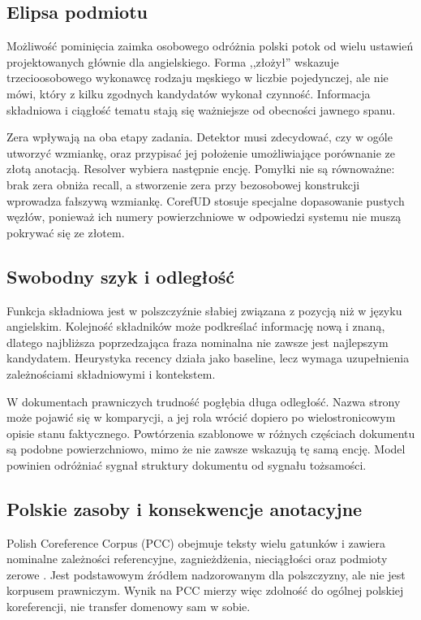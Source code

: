 \subsection{Elipsa podmiotu}

Możliwość pominięcia zaimka osobowego odróżnia polski potok od wielu ustawień projektowanych głównie dla angielskiego. Forma ,,złożył'' wskazuje trzecioosobowego wykonawcę rodzaju męskiego w liczbie pojedynczej, ale nie mówi, który z kilku zgodnych kandydatów wykonał czynność. Informacja składniowa i ciągłość tematu stają się ważniejsze od obecności jawnego spanu.

Zera wpływają na oba etapy zadania. Detektor musi zdecydować, czy w ogóle utworzyć wzmiankę, oraz przypisać jej położenie umożliwiające porównanie ze złotą anotacją. Resolver wybiera następnie encję. Pomyłki nie są równoważne: brak zera obniża recall, a stworzenie zera przy bezosobowej konstrukcji wprowadza fałszywą wzmiankę. CorefUD stosuje specjalne dopasowanie pustych węzłów, ponieważ ich numery powierzchniowe w odpowiedzi systemu nie muszą pokrywać się ze złotem.

\subsection{Swobodny szyk i odległość}

Funkcja składniowa jest w polszczyźnie słabiej związana z pozycją niż w języku angielskim. Kolejność składników może podkreślać informację nową i znaną, dlatego najbliższa poprzedzająca fraza nominalna nie zawsze jest najlepszym kandydatem. Heurystyka recency działa jako baseline, lecz wymaga uzupełnienia zależnościami składniowymi i kontekstem.

W dokumentach prawniczych trudność pogłębia długa odległość. Nazwa strony może pojawić się w komparycji, a jej rola wrócić dopiero po wielostronicowym opisie stanu faktycznego. Powtórzenia szablonowe w różnych częściach dokumentu są podobne powierzchniowo, mimo że nie zawsze wskazują tę samą encję. Model powinien odróżniać sygnał struktury dokumentu od sygnału tożsamości.

\subsection{Polskie zasoby i konsekwencje anotacyjne}

Polish Coreference Corpus (PCC) obejmuje teksty wielu gatunków i zawiera nominalne zależności referencyjne, zagnieżdżenia, nieciągłości oraz podmioty zerowe \cite{ogrodniczuk_2014_pcc,ogrodniczuk_2019_referencyjne}. Jest podstawowym źródłem nadzorowanym dla polszczyzny, ale nie jest korpusem prawniczym. Wynik na PCC mierzy więc zdolność do ogólnej polskiej koreferencji, nie transfer domenowy sam w sobie.

